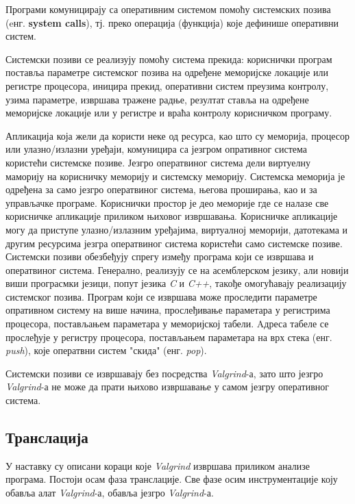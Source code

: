 \documentclass[12pt,oneside]{memoir}
\begin{document}
\indent Програми комуницирају са оперативним системом помоћу системских позива (eнг. \textbf{system calls}), тј. преко операција (функција) које дефинише оперативни систем.

\indent Системски позиви се реализују помоћу система прекида: кориснички програм поставља параметре системског позива на одређене меморијске локације или регистре процесора, иницира прекид, оперативни систем преузима контролу, узима параметре, извршава тражене радње, резултат ставља на одређене меморијске локације или у регистре и враћа контролу корисничком програму.

\indent Апликација која жели да користи неке од ресурса, као што су меморија, процесор или улазно/излазни уређаји, комуницира са језгром опративног система користећи системске позиве. Језгро оператвиног система дели виртуелну маморију на корисничку меморију и системску меморију. Системска меморија је одређена за само језгро оператвиног система, његова проширања, као и за управљачке програме. Кориснички простор је део меморије где се налазе све корисничке апликације приликом њиховог извршавања. Корисничке апликације могу да приступе улазно/излазним уређајима, виртуалној меморији, датотекама и другим ресурсима језгра оператвиног система користећи само системске позиве. Системски позиви обезбеђују спрегу између програма који се извршава и оператвиног система. Генерално, реализују се на асемблерском језику, али новији виши програсмки језици, попут језика \textit{C} и \textit{C++}, такође омогућавају реализацију системског позива. Програм који се извршава може проследити параметре опративном систему на више начина, прослеђивање параметара у регистрима процесора, постављањем параметара у меморијској табели. Aдреса табеле се прослеђује у регистру процесора, постављањем параметара на врх стека (енг. \textit{push}), које оператвни систем "скида" (енг. \textit{pop}).

\indent Системски позиви се извршавају без посредства \textit{Valgrind}-а, зато што језгро \textit{Valgrind}-а не може да прати њихово извршавање у самом језгру оперативног система.


\subsection{Транслација}

\indent У наставку су описани кораци које \textit{Valgrind} извршава приликом анализе програма. Постоји осам фаза транслације. Све фазе осим инструментације коју обавља алат \textit{Valgrind}-а, обавља језгро \textit{Valgrind}-а.
\end{document}
